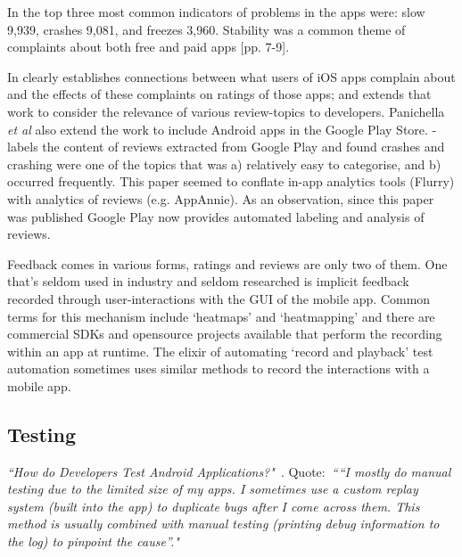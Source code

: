 In \citet[p. 5]{fu2013_why_people_hate_your_app_making_sense_of_user_feedback_in_a_mobile_app_store} the top three most common indicators of problems in the apps were: slow 9,939, crashes 9,081, and freezes 3,960. Stability was a common theme of complaints about both free and paid apps [pp. 7-9]. 

In \citet{khalid2015_what_do_mobile_app_users_complain_about} clearly establishes connections between what users of iOS apps complain about and the effects of these complaints on ratings of those apps; and \citet{panichella2015_how_can_i_improve_my_app_classifying_user_reviews_for_sw_maintenance_and_evolution} extends that work to consider the relevance of various review-topics to developers. Panichella \emph{et al} also extend the work to include Android apps in the Google Play Store. \citet{mcilroy2016_analyzing_and_automatically_labelling_the_types_of_user_issues_raised_in_mobile_app_reviews} - labels the content of reviews extracted from Google Play and found crashes and crashing were one of the topics that was a) relatively easy to categorise, and b) occurred frequently. This paper seemed to conflate in-app analytics tools (Flurry) with analytics of reviews (e.g. AppAnnie). As an observation, since this paper was published Google Play now provides automated labeling and analysis of reviews.

Feedback comes in various forms, ratings and reviews are only two of them.  One that's seldom used in industry and seldom researched is implicit feedback recorded through user-interactions with the GUI of the mobile app. Common terms for this mechanism include `heatmaps' and `heatmapping' and there are commercial SDKs and opensource projects available that perform the recording within an app at runtime. The elixir of automating `record and playback' test automation sometimes uses similar methods to record the interactions with a mobile app. 

\subsection{Testing}
\emph{``How do Developers Test Android Applications?"}~\citep{linares2017_how_do_developers_test_android_apps}. Quote:~\emph{``“I mostly do manual testing due to the limited size of my apps. I sometimes use a custom replay system (built into the app) to duplicate bugs after I come across them. This method is usually combined with manual testing (printing debug information to the log) to pinpoint the cause”."}

